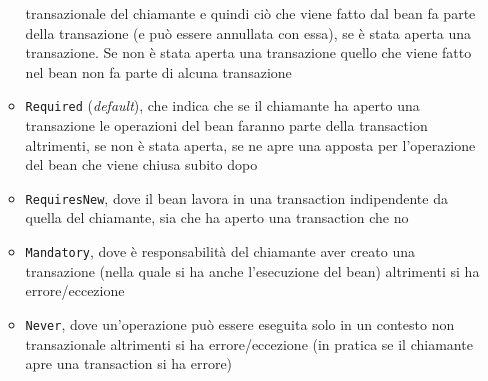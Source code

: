 \documentclass[a4paper,12pt, oneside]{book}
\begin{document}
\begin{enumerate}
\begin{itemize}
    transazionale del chiamante e quindi ciò che viene fatto dal bean fa parte
    della transazione (e può essere annullata con essa), se è stata aperta una
    transazione. Se non è stata aperta una transazione quello che viene fatto
    nel bean non fa parte di alcuna transazione
    \item \texttt{Required} (\textit{default}), che indica che se il chiamante
    ha aperto una transazione le operazioni del bean faranno parte della
    transaction altrimenti, se non è stata aperta, se ne apre una apposta per
    l'operazione del bean che viene chiusa subito dopo
    \item \texttt{RequiresNew}, dove il bean lavora in una transaction
    indipendente da quella del chiamante, sia che ha aperto una transaction che
    no 
    \item \texttt{Mandatory}, dove è responsabilità del chiamante aver creato
    una transazione (nella quale si ha anche l'esecuzione del bean) altrimenti
    si ha errore/eccezione
    \item \texttt{Never}, dove un'operazione può essere eseguita solo in un
    contesto non transazionale altrimenti si ha errore/eccezione (in pratica se
    il  chiamante apre una transaction si ha errore)
    

\end{itemize}
\end{enumerate}
\end{document}
